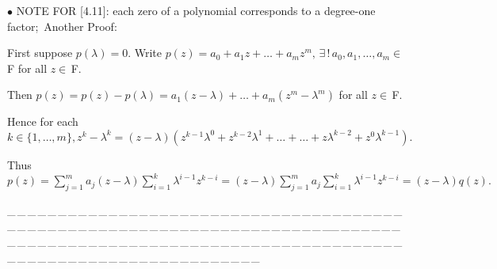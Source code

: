 \documentclass[a4paper, 11pt, UTF8]{article}
\def\Fbf{$\,{\timesbf F}\,$}
\def\Fbfc{$\,{\timesbf F}$}
\begin{document}
\begin{large}
{\small $\bullet$ } {\timesbf\Large N{\normalsize OTE} F{\normalsize OR} [4.11]:} {\timessl each zero of a polynomial corresponds to a degree-one factor;}\,\,\,{\timessl\Large Another Proof:}\par\quad
First suppose $p(\lambda)=0.$ Write $p(z)=a_0+a_1 z+\dots+a_m z^m,\,\exists\,!\,a_0,a_1,\dots,a_m\in\Fbf\,$for all $z\in\Fbfc.$\par\quad
Then $p(z)=p(z)-p(\lambda)=a_1(z-\lambda)+\dots+a_m(z^m-\lambda^m)$ for all $z\in\Fbfc.$\par\quad
Hence for each $k\in\{1,\dots,m\},z^k-\lambda^k=(z-\lambda)( z^{k-1}\lambda^0+ z^{k-2}\lambda^1+\dots+\dots+z\lambda^{k-2}+z^{0}\lambda^{k-1}).$\par\quad
Thus $p(z)=\sum\limits_{j=1}^m a_j (z-\lambda)\sum\limits_{i=1}^k \lambda^{i-1}z^{k-i}=(z-\lambda)\sum\limits_{j=1}^m a_j\sum\limits_{i=1}^k \lambda^{i-1}z^{k-i}=(z-\lambda)q(z).$
\par
{\tiny \_\,\_\,\_\,\_\,\_\,\_\,\_\,\_\,\_\,\_\,\_\,\_\,\_\,\_\,\_\,\_\,\_\,\_\,\_\,\_\,\_\,\_\,\_\,\_\,\_\,\_\,\_\,\_\,\_\,\_\,\_\,\_\,\_\,\_\,\_\,\_\,\_\,\_\,\_\,\_\,\_\,\_\,\_\,\_\,\_\,\_\,\_\,\_\,\_\,\_\,\_\,\_\,\_\,\_\,\_\,\_\,\_\,\_\,\_\,\_\,\_\,\_\,\_\,\_\,\_\,\_\,\_\,\_\,\_\,\_\,\_\_\,\_\,\_\,\_\,\_\,\_\,\_\,\_\,\_\,\_\,\_\,\_\,\_\,\_\,\_\,\_\,\_\,\_\,\_\,\_\,\_\,\_\,\_\,\_\,\_\,\_\,\_\,\_\,\_\,\_\,\_\,\_\,\_\,\_\,\_\,\_\,\_\,\_\,\_\,\_\,\_\,\_\,\_\,\_\,\_\,\_\,\_\,\_\,\_\,\_\,\_\,\_\,\_\,\_\,\_\,\_\,\_\,\_\,\_\,\_\,\_\,\_\,\_\,\_\,\_\,\_\,\_\,\_\,\_\,\_\,\_}\par


\end{large}
\end{document}
